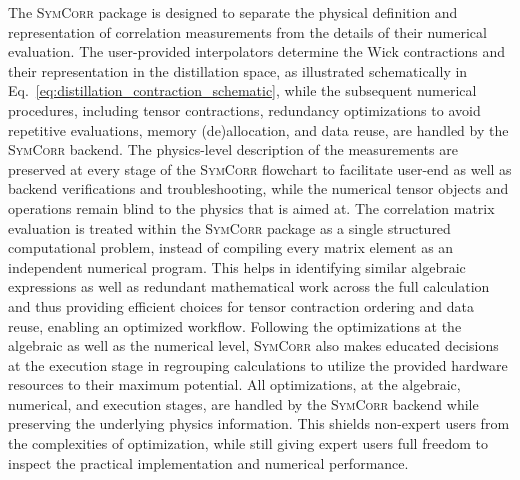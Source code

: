 \documentclass[a4paper,fleqn]{cas-dc}
\begin{document}
The \textsc{SymCorr} package is designed to separate the physical definition and representation of correlation measurements from the details of their numerical evaluation. The user-provided interpolators determine the Wick contractions and their representation in the distillation space, as illustrated schematically in Eq.~\ref{eq:distillation_contraction_schematic}, while the subsequent numerical procedures, including tensor contractions, redundancy optimizations to avoid repetitive evaluations, memory (de)allocation, and data reuse, are handled by the \textsc{SymCorr} backend. The physics-level description of the measurements are preserved at every stage of the \textsc{SymCorr} flowchart to facilitate user-end as well as backend verifications and troubleshooting, while the numerical tensor objects and operations remain blind to the physics that is aimed at. The correlation matrix evaluation is treated within the \textsc{SymCorr} package as a single structured computational problem,  instead of compiling every matrix element as an independent numerical program. This helps in identifying similar algebraic expressions as well as redundant mathematical work across the full calculation and thus providing efficient choices for tensor contraction ordering and data reuse, enabling an optimized workflow. Following the optimizations at the algebraic as well as the numerical level, \textsc{SymCorr} also makes educated decisions at the execution stage in regrouping calculations to utilize the provided hardware resources to their maximum potential. All optimizations, at the algebraic, numerical, and execution stages, are handled by the \textsc{SymCorr} backend while preserving the underlying physics information. This shields non-expert users from the complexities of optimization, while still giving expert users full freedom to inspect the practical implementation and numerical performance.
\end{document}

